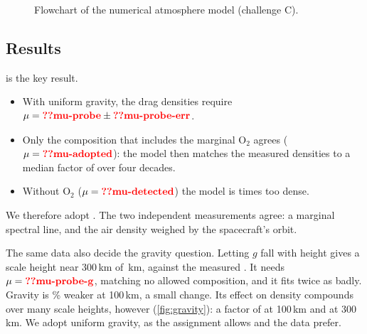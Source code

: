 \documentclass[aps,prd,twocolumn,nofootinbib,floatfix,superscriptaddress]{revtex4-2}
\begin{document}
\begin{figure}[tbp]\centering
{}
\caption{Flowchart of the numerical atmosphere model (challenge C).}\label{fig:flowC}
\end{figure}

\subsection{Results}
 is the key result.
\begin{itemize}
\item With uniform gravity, the drag densities require $\mu=\val{mu-probe}\pm\val{mu-probe-err}$.
\item Only the composition that includes the marginal O$_2$ agrees ($\mu=\val{mu-adopted}$): the model then matches the measured densities to a median factor of  over four decades.
\item Without O$_2$ ($\mu=\val{mu-detected}$) the model is  times too dense.
\end{itemize}
We therefore adopt .
The two independent measurements agree: a marginal spectral line, and the air density weighed by the spacecraft's orbit.

The same data also decide the gravity question.
Letting $g$ fall with height gives a scale height near 300\,km of \,km, against the measured .
It needs $\mu=\val{mu-probe-g}$, matching no allowed composition, and it fits twice as badly.
Gravity is \% weaker at 100\,km, a small change.
Its effect on density compounds over many scale heights, however (\cref{fig:gravity}): a factor of  at 100\,km and  at 300\,km.
We adopt uniform gravity, as the assignment allows and the data prefer.
\end{document}
